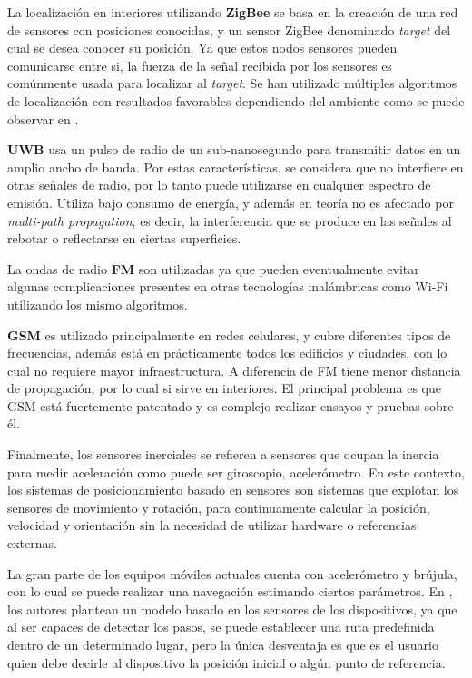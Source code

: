 La localización en interiores utilizando \textbf{ZigBee} se basa en la creación de una red de sensores con posiciones conocidas, y un sensor ZigBee denominado \textit{target} del cual se desea conocer su posición. Ya que estos nodos sensores pueden comunicarse entre si, la fuerza de la señal recibida por los sensores es comúnmente usada para localizar al \textit{target}. Se han utilizado múltiples algoritmos de localización con resultados favorables dependiendo del ambiente como se puede observar en \citep{6156509}.

\textbf{UWB} usa un pulso de radio de un sub-nanosegundo para transmitir datos en un amplio ancho de banda. Por estas características, se considera que no interfiere en otras señales de radio, por lo tanto puede utilizarse en cualquier espectro de emisión.  Utiliza bajo consumo de energía, y además en teoría no es afectado por \textit{multi-path propagation}, es decir, la interferencia que se produce en las señales al rebotar o reflectarse en ciertas superficies.

La ondas de radio \textbf{FM} son utilizadas ya que pueden eventualmente evitar algunas complicaciones presentes en otras tecnologías inalámbricas como Wi-Fi utilizando los mismo algoritmos.

\textbf{GSM} es utilizado principalmente en redes celulares, y cubre diferentes tipos de frecuencias, además está en prácticamente todos los edificios y ciudades, con lo cual no requiere mayor infraestructura. A diferencia de FM tiene menor distancia de propagación, por lo cual si sirve en interiores. El principal problema es que GSM está fuertemente patentado y es complejo realizar ensayos y pruebas sobre él.

Finalmente, los sensores inerciales se refieren a sensores que ocupan la inercia para medir aceleración como puede ser giroscopio, acelerómetro. En este contexto, los sistemas de posicionamiento basado en sensores son sistemas que explotan  los sensores de movimiento y rotación, para continuamente calcular la posición, velocidad y orientación sin la necesidad de utilizar hardware o referencias externas.

La gran parte de los equipos móviles actuales cuenta con acelerómetro y brújula, con lo cual se puede realizar una navegación estimando ciertos parámetros. En \citep{6071934, 5766963} , los autores plantean un modelo basado en los sensores de los dispositivos, ya que al ser capaces de detectar los pasos, se puede establecer una ruta predefinida dentro de un determinado lugar, pero la única desventaja es que es el usuario quien debe decirle al dispositivo la posición inicial o algún punto de referencia.

